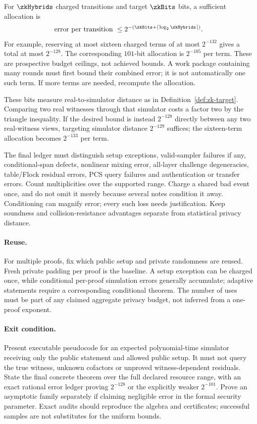 For $\zkHybrids$ charged transitions and target $\zkBits$ bits, a sufficient allocation is
\[
 \text{error per transition}\ \le
 2^{-(\zkBits+\lceil\log_2\zkHybrids\rceil)}.
\]
For example, reserving at most sixteen charged terms of at most $2^{-132}$ gives a total at most $2^{-128}$. The corresponding $101$-bit allocation is $2^{-105}$ per term. These are prospective budget ceilings, not achieved bounds. A work package containing many rounds must first bound their combined error; it is not automatically one such term. If more terms are needed, recompute the allocation.

These bits measure real-to-simulator distance as in Definition~\ref{def:zk-target}. Comparing two real witnesses through that simulator costs a factor two by the triangle inequality. If the desired bound is instead $2^{-128}$ directly between any two real-witness views, targeting simulator distance $2^{-129}$ suffices; the sixteen-term allocation becomes $2^{-133}$ per term.

The final ledger must distinguish setup exceptions, valid-sampler failures if any, conditional-span defects, nonlinear mixing error, all-layer challenge degeneracies, table/Flock residual errors, PCS query failures and authentication or transfer errors. Count multiplicities over the supported range. Charge a shared bad event once, and do not omit it merely because several notes condition it away. Conditioning can magnify error; every such loss needs justification. Keep soundness and collision-resistance advantages separate from statistical privacy distance.

\paragraph{Reuse.} For multiple proofs, fix which public setup and private randomness are reused. Fresh private padding per proof is the baseline. A setup exception can be charged once, while conditional per-proof simulation errors generally accumulate; adaptive statements require a corresponding conditional theorem. The number of uses must be part of any claimed aggregate privacy budget, not inferred from a one-proof exponent.

\paragraph{Exit condition.} Present executable pseudocode for an expected polynomial-time simulator receiving only the public statement and allowed public setup. It must not query the true witness, unknown cofactors or unproved witness-dependent residuals. State the final concrete theorem over the full declared resource range, with an exact rational error ledger proving $2^{-128}$ or the explicitly weaker $2^{-101}$. Prove an asymptotic family separately if claiming negligible error in the formal security parameter. Exact audits should reproduce the algebra and certificates; successful samples are not substitutes for the uniform bounds.

